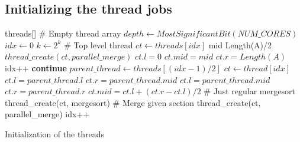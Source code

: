 \subsection{Initializing the thread jobs}
\begin{algorithm}
  \begin{algorithmic}[1]
    \Require threads[] \# Empty thread array
    \State $depth \leftarrow MostSignificantBit(NUM\_CORES)$
    \State $idx \leftarrow 0$
    \State $k \leftarrow 2^k$
    \State \# Top level thread
    \State $ct \leftarrow threads[idx]$
    \State mid \leftarrow Length(A)/2
    \State $thread\_create(ct, parallel\_merge)$
    \State $ct.l = 0$
    \State $ct.mid = mid$
    \State $ct.r = Length(A)$
    \State idx++
    \State \textbf{continue}
    \EndIf
    \State $parent\_thread \leftarrow threads[(idx - 1)/2]$
    \State $ct \leftarrow thread[idx]$
    \State $ct.l = parent\_thread.l$
    \State $ct.r = parent\_thread.mid$
    \Else
    \State $ct.l = parent\_thread.mid$
    \State $ct.r = parent\_thread.r$
    \EndIf
    \State $ct.mid = ct.l + (ct.r - ct.l)/2$
    \State \# Just regular mergesort
    \State thread\_create(ct, mergesort)
    \Else
    \State \# Merge given section
    \State thread\_create(ct, parallel\_merge)
    \EndIf
    \State idx++
    \EndFor
    \EndFor
  \EndProcedure
  \end{algorithmic}
  \caption{Initialization of the threads}\label{algo:threads}
\end{algorithm}

